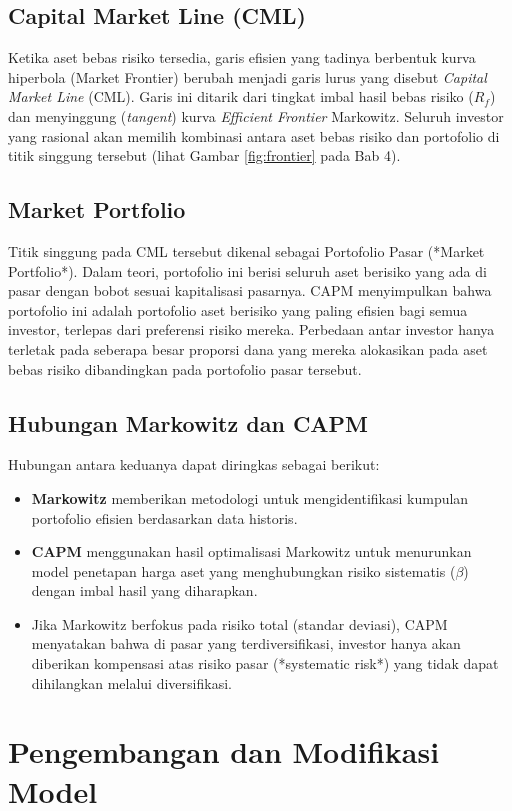 \documentclass[12pt,a4paper]{book}
\begin{document}
\section{Capital Market Line (CML)}
Ketika aset bebas risiko tersedia, garis efisien yang tadinya berbentuk kurva hiperbola (Market Frontier) berubah menjadi garis lurus yang disebut \textit{Capital Market Line} (CML). Garis ini ditarik dari tingkat imbal hasil bebas risiko ($R_f$) dan menyinggung (\textit{tangent}) kurva \textit{Efficient Frontier} Markowitz. Seluruh investor yang rasional akan memilih kombinasi antara aset bebas risiko dan portofolio di titik singgung tersebut (lihat Gambar \ref{fig:frontier} pada Bab 4).

\section{Market Portfolio}
Titik singgung pada CML tersebut dikenal sebagai Portofolio Pasar (*Market Portfolio*). Dalam teori, portofolio ini berisi seluruh aset berisiko yang ada di pasar dengan bobot sesuai kapitalisasi pasarnya. CAPM menyimpulkan bahwa portofolio ini adalah portofolio aset berisiko yang paling efisien bagi semua investor, terlepas dari preferensi risiko mereka. Perbedaan antar investor hanya terletak pada seberapa besar proporsi dana yang mereka alokasikan pada aset bebas risiko dibandingkan pada portofolio pasar tersebut.

\section{Hubungan Markowitz dan CAPM}
Hubungan antara keduanya dapat diringkas sebagai berikut:
\begin{itemize}
    \item \textbf{Markowitz} memberikan metodologi untuk mengidentifikasi kumpulan portofolio efisien berdasarkan data historis.
    \item \textbf{CAPM} menggunakan hasil optimalisasi Markowitz untuk menurunkan model penetapan harga aset yang menghubungkan risiko sistematis ($\beta$) dengan imbal hasil yang diharapkan.
    \item Jika Markowitz berfokus pada risiko total (standar deviasi), CAPM menyatakan bahwa di pasar yang terdiversifikasi, investor hanya akan diberikan kompensasi atas risiko pasar (*systematic risk*) yang tidak dapat dihilangkan melalui diversifikasi.
\end{itemize}

\chapter{Pengembangan dan Modifikasi Model}
\end{document}
